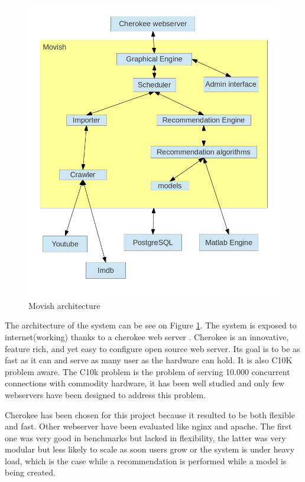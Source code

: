 \begin{figure}
  \centering
  \includegraphics[width=\textwidth]{figures/movish_architecture.png}
  \caption{Movish architecture}
  \label{fig:movish_architecture}
\end{figure}

The architecture of the system can be see on Figure \ref{fig:movish_architecture}.
The system is exposed to internet(working) thanks to a cherokee web server \cite{cherokee}. Cherokee is an innovative, feature rich, and yet easy to configure open source web server. Its goal is to be as fast as it can and serve as many user as the hardware can hold. It is also C10K problem \cite{c10k-problem} aware. The C10k problem is the problem of serving 10.000 concurrent connections with commodity hardware, it has been well studied and only few webservers have been designed to address this problem.

Cherokee has been chosen for this project because it resulted to be both flexible and fast. Other webserver have been evaluated like nginx and apache. The first one was very good in benchmarks but lacked in flexibility, the latter was very modular but less likely to scale as soon users grow or the system is under heavy load, which is the case while a recommendation is performed while a model is being created.

